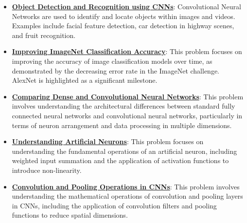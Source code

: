 \documentclass{article}%
\begin{document}
\begin{itemize}[leftmargin=*]%
\item \href{https://purdue.brightspace.com/d2l/common/assets/pdfjs-d2l-dist/1.0.14-legacy/web/viewer.html?file=\%2Fcontent\%2Fenforced\%2F1095467-wl.202510.CS.24300.001\%2F09L1-cnn.pdf\%3Fou\%3D1095467\&lang=en-us\&container=d2l-fileviewer-rendered-pdf\&fullscreen=d2l-fileviewer-rendered-pdf-dialog\&height=667#page=2}{\textbf{Object Detection and Recognition using CNNs}}: Convolutional Neural Networks are used to identify and locate objects within images and videos. Examples include facial feature detection, car detection in highway scenes, and fruit recognition.%
\item \href{https://purdue.brightspace.com/d2l/common/assets/pdfjs-d2l-dist/1.0.14-legacy/web/viewer.html?file=\%2Fcontent\%2Fenforced\%2F1095467-wl.202510.CS.24300.001\%2F09L1-cnn.pdf\%3Fou\%3D1095467\&lang=en-us\&container=d2l-fileviewer-rendered-pdf\&fullscreen=d2l-fileviewer-rendered-pdf-dialog\&height=667#page=3}{\textbf{Improving ImageNet Classification Accuracy}}: This problem focuses on improving the accuracy of image classification models over time, as demonstrated by the decreasing error rate in the ImageNet challenge. AlexNet is highlighted as a significant milestone.%
\item \href{https://purdue.brightspace.com/d2l/common/assets/pdfjs-d2l-dist/1.0.14-legacy/web/viewer.html?file=\%2Fcontent\%2Fenforced\%2F1095467-wl.202510.CS.24300.001\%2F09L1-cnn.pdf\%3Fou\%3D1095467\&lang=en-us\&container=d2l-fileviewer-rendered-pdf\&fullscreen=d2l-fileviewer-rendered-pdf-dialog\&height=667#page=4}{\textbf{Comparing Dense and Convolutional Neural Networks}}: This problem involves understanding the architectural differences between standard fully connected neural networks and convolutional neural networks, particularly in terms of neuron arrangement and data processing in multiple dimensions.%
\item \href{https://purdue.brightspace.com/d2l/common/assets/pdfjs-d2l-dist/1.0.14-legacy/web/viewer.html?file=\%2Fcontent\%2Fenforced\%2F1095467-wl.202510.CS.24300.001\%2F09L1-cnn.pdf\%3Fou\%3D1095467\&lang=en-us\&container=d2l-fileviewer-rendered-pdf\&fullscreen=d2l-fileviewer-rendered-pdf-dialog\&height=667#page=5}{\textbf{Understanding Artificial Neurons}}: This problem focuses on understanding the fundamental operations of an artificial neuron, including weighted input summation and the application of activation functions to introduce non-linearity.%
\item \href{https://purdue.brightspace.com/d2l/common/assets/pdfjs-d2l-dist/1.0.14-legacy/web/viewer.html?file=\%2Fcontent\%2Fenforced\%2F1095467-wl.202510.CS.24300.001\%2F09L1-cnn.pdf\%3Fou\%3D1095467\&lang=en-us\&container=d2l-fileviewer-rendered-pdf\&fullscreen=d2l-fileviewer-rendered-pdf-dialog\&height=667#page=6}{\textbf{Convolution and Pooling Operations in CNNs}}: This problem involves understanding the mathematical operations of convolution and pooling layers in CNNs, including the application of convolution filters and pooling functions to reduce spatial dimensions.%

\end{itemize}
\end{document}
